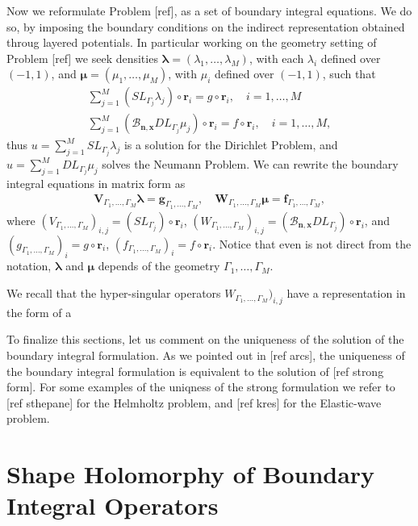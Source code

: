 \documentclass{article}
\newcommand{\todo}[1]{{\color{red}[#1]}}
\newcommand{\bmu} {\bm{\mu}}
\newcommand{\bg}{\bm{g}}
\newcommand{\bla}{\boldsymbol \lambda}
\newcommand{\bn}{\bm{n}}
\newcommand{\br}{\bm{r}}
\newcommand{\bx}{\bm{x}}
\begin{document}
Now we reformulate Problem \todo{ref}, as a set of boundary integral equations. We do so, by imposing the boundary conditions on the indirect representation obtained throug layered potentials. In particular working on the geometry setting of Problem \todo{ref} we seek densities $\bla = (\lambda_1,\hdots,\lambda_M)$, with each $\lambda_i$ defined over $(-1,1)$, and $\bmu = (\mu_1, \hdots, \mu_M)$, with $\mu_i$ defined over $(-1,1)$, such that
\begin{align*}
\sum_{j=1}^M (SL_{\Gamma_j} \lambda_j )\circ \br_i = g\circ \br_i, \quad i = 1,\hdots,M \\
\sum_{j=1}^M (\mathcal{B}_{\bn,\bx}DL_{\Gamma_j} \mu_j )\circ \br_i = f\circ \br_i, \quad i = 1,\hdots,M,
\end{align*}
 thus $u = \sum_{j=1}^M SL_{\Gamma_j} \lambda_j $ is a solution for the Dirichlet Problem, and  $u = \sum_{j=1}^M DL_{\Gamma_j} \mu_j $ solves the Neumann Problem. We can rewrite the boundary integral equations in matrix form as 
\begin{align}
\label{eq:bios}
\mathbf{V}_{\Gamma_1,\hdots,\Gamma_M} \bla = \bg_{\Gamma_1,\hdots,\Gamma_M}, \quad \mathbf{W}_{\Gamma_1,\hdots,\Gamma_M} \bmu = \mathbf{f}_{\Gamma_1,\hdots,\Gamma_M},
\end{align}
where $(V_{\Gamma_1,\hdots,\Gamma_M})_{i,j} = (SL_{\Gamma_j}  )\circ \br_i$, $(W_{\Gamma_1,\hdots,\Gamma_M})_{i,j} = (\mathcal{B}_{\bn,\bx}DL_{\Gamma_j} )\circ \br_i$, and $(g_{\Gamma_1,\hdots,\Gamma_M})_i = g \circ \br_i$, $(f_{\Gamma_1,\hdots,\Gamma_M})_i = f \circ \br_i$. Notice that even is not direct from the notation, $\bla$ and $\bmu$ depends of the geometry $\Gamma_1,\hdots,\Gamma_M$.

We recall that the hyper-singular operators $ W_{\Gamma_1,\hdots,\Gamma_M})_{i,j}$ have a representation in the form of a 

To finalize this sections, let us comment on the uniqueness of the solution of the boundary integral formulation. As we pointed out in \todo{ref arcs}, the uniqueness of the boundary integral formulation is equivalent to the solution of \todo{ref strong form}. For some examples of the uniqness of the strong formulation we refer to \todo{ref sthepane} for the Helmholtz problem, and \todo{ref kres} for the Elastic-wave problem.
\section{Shape Holomorphy of Boundary Integral Operators}
\end{document}
